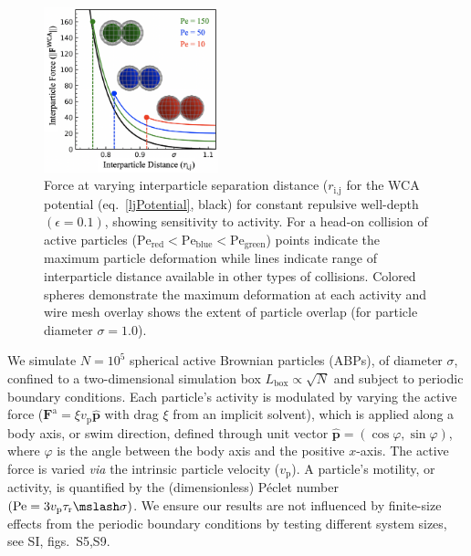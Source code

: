 \documentclass[twoside,twocolumn,9pt]{article}
\begin{document}
\begin{figure}%
   \includegraphics[width=0.45\textwidth,trim={0 0 0 0},clip]{figure_3.png}
  \caption{Force at varying interparticle separation distance ($r_\text{i,j}$ for the WCA potential (eq.~\ref{ljPotential}, black) for constant repulsive well-depth $(\epsilon=0.1)$, showing sensitivity to activity. For a head-on collision of active particles
($\mathrm{Pe}_\text{red}<\mathrm{Pe}_\text{blue}<\mathrm{Pe}_\text{green}$) points indicate the maximum particle deformation while lines indicate range of interparticle distance available in other types of collisions. Colored spheres demonstrate the maximum deformation at each activity and wire mesh overlay shows the extent of particle overlap (for particle diameter $\sigma=1.0$).}
  \label{schematic}
\end{figure}

We simulate $N=10^5$ spherical active Brownian particles (ABPs), of diameter $\sigma$, confined to a  two-dimensional simulation box $L_\text{box}\propto\sqrt{N}$ and subject to periodic boundary conditions. Each particle's activity is modulated by varying the active force (${\mathbf{F}}^\text{a}=\xi v_\text{p}\widehat{\mathbf{p}}$ with drag $\xi$ from an implicit solvent\footnotemark), which is applied along a body axis, or swim direction, defined through unit vector $\widehat{\mathbf{p}}=(\cos{\varphi},\sin{\varphi})$, where $\varphi$ is the angle between the body axis and the positive $x$-axis. The active force is varied \textit{via} the intrinsic particle velocity ($v_\mathrm{p}$). A particle's motility, or activity, is quantified by the (dimensionless) P\'eclet number $(\mathrm{Pe}=3v_\text{p}\tau_\text{r}\mslash \sigma)$. We ensure our results are not influenced by finite-size effects from the periodic boundary conditions by testing different system sizes, see SI, figs.~S5,S9. 

\end{document}
